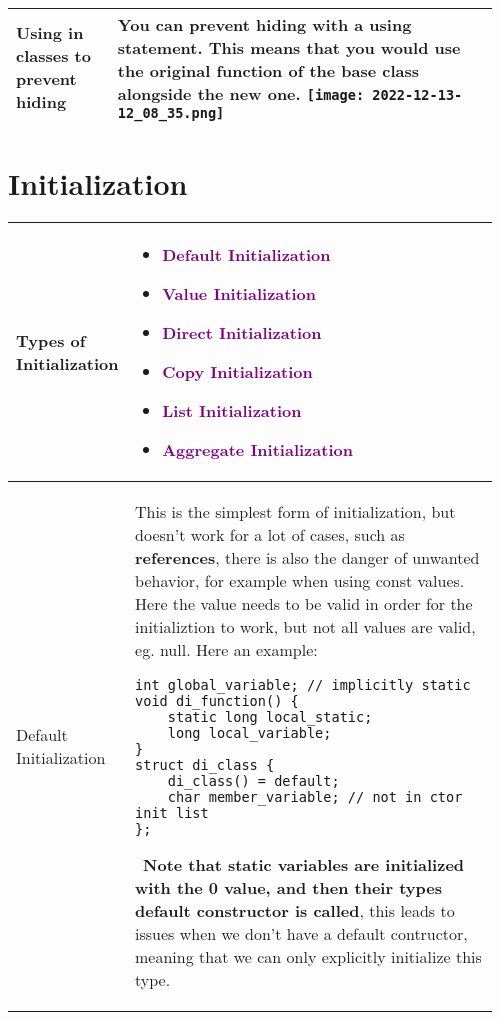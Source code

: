 \documentclass[main.tex,fontsize=8pt,paper=a4,paper=portrait,DIV=calc,]{scrartcl}
\begin{document}
\begin{table}[ht!]
\begin{tabular}{|m{0.2\linewidth}|m{0.755\linewidth}|}
\hline
Using in classes to prevent hiding & 
You can prevent hiding with a \textbf{using} statement.\newline
This means that you would use the original function of the base class alongside the new one.\newline
\texttt{[image: 2022-12-13-12\_08\_35.png]}\\
\hline
\end{tabular}
\section{Initialization}
\begin{tabular}{|m{0.2\linewidth}|m{0.755\linewidth}|}
\hline
Types of Initialization & 
\vspace{2mm}
\begin{itemize}
\item \textcolor{purple}{Default Initialization}
\item \textcolor{purple}{Value Initialization}
\item \textcolor{purple}{Direct Initialization}
\item \textcolor{purple}{Copy Initialization}
\item \textcolor{purple}{List Initialization}
\item \textcolor{purple}{Aggregate Initialization}
\vspace{-3mm}
\end{itemize} 
\\
\hline
Default Initialization & 
This is the simplest form of initialization, but doesn't work for a lot of cases, such as \textbf{references}, there is also the danger of unwanted behavior, for example when using const values. Here the value needs to be valid in order for the initializtion to work, but not all values are valid, eg. null.\newline 
Here an example:\newline 
\begin{lstlisting}
int global_variable; // implicitly static
void di_function() {
    static long local_static;
    long local_variable;
}
struct di_class {
    di_class() = default;
    char member_variable; // not in ctor init list
};
\end{lstlisting}
\, \newline
\textbf{Note that static variables are initialized with the 0 value, and then their types default constructor is called}, this leads to issues when we don't have a default contructor, meaning that we can only explicitly initialize this type.\newline 

\end{tabular}
\end{table}
\end{document}
